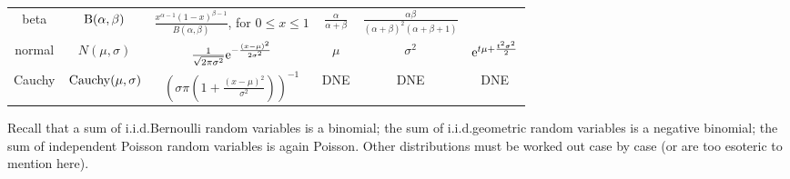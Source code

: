 \begin{center}
{\begin{tabular}{|c|c|c|c|c|c|}
    beta
        &\(\mathrm{B}(\alpha,\beta)\)
        &\(\frac{x^{\alpha-1}(1-x)^{\beta-1}}{B(\alpha,\beta)}\),
          for \(0\leq x\leq 1\)
        &\(\frac{\alpha}{\alpha+\beta}\)
        &\(\frac{\alpha\beta}{(\alpha+\beta)^2(\alpha+\beta+1)}\)
        &
    \\
    normal
        &\(N(\mu,\sigma)\)
        &\(\frac{1}{\sqrt{2\pi\sigma^2}}\mathrm{e}^{-\frac{(x-\mu)^2}{2\sigma^2}}\)
        &\(\mu\)
        &\(\sigma^2\)
        &\(\mathrm{e}^{t\mu+\frac{t^2\sigma^2}{2}}\)
    \\
    Cauchy
        &\(\operatorname{Cauchy}(\mu,\sigma)\)
        &\((\sigma\pi(1+\frac{(x-\mu)^2}{\sigma^2}))^{-1}\)
        &DNE
        &DNE
        &DNE
    \\
    \hline
  \end{tabular}
}
\end{center}

Recall that a sum of i.i.d.\@ Bernoulli random variables is a binomial; the
sum of i.i.d.\@ geometric random variables is a negative binomial; the sum
of independent Poisson random variables is again Poisson. Other
distributions must be worked out case by case (or are too esoteric to
mention here).

